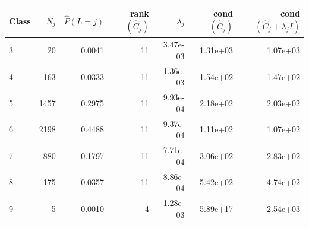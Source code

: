 \begin{tabular}{lrrrrrr}
\toprule
Class & $N_j$ & $\hat P(L{=}j)$ & rank$(\hat C_j)$ & $\lambda_j$ & cond$(\hat C_j)$ & cond$(\hat C_j+\lambda_j I)$ \\
\midrule
3 & 20 & 0.0041 & 11 & 3.47e-03 & 1.31e+03 & 1.07e+03 \\
4 & 163 & 0.0333 & 11 & 1.36e-03 & 1.54e+02 & 1.47e+02 \\
5 & 1457 & 0.2975 & 11 & 9.93e-04 & 2.18e+02 & 2.03e+02 \\
6 & 2198 & 0.4488 & 11 & 9.37e-04 & 1.11e+02 & 1.07e+02 \\
7 & 880 & 0.1797 & 11 & 7.71e-04 & 3.06e+02 & 2.83e+02 \\
8 & 175 & 0.0357 & 11 & 8.86e-04 & 5.42e+02 & 4.74e+02 \\
9 & 5 & 0.0010 & 4 & 1.28e-03 & 5.89e+17 & 2.54e+03 \\
\bottomrule
\end{tabular}
